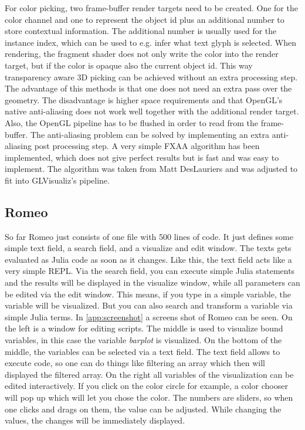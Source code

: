 For color picking, two frame-buffer render targets need to be created. 
One for the color channel and one to represent the object id plus an additional number to store contextual information. The additional number is usually used for the instance index, which can be used to e.g. infer what text glyph is selected.
When rendering, the fragment shader does not only write the color into the render target, but if the color is opaque also the current object id.
This way transparency aware 3D picking can be achieved without an extra processing step. 
The advantage of this methods is that one does not need an extra pass over the geometry. The disadvantage is higher space requirements and that OpenGL's native anti-aliasing does not work well together with the additional render target. Also, the OpenGL pipeline has to be flushed in order to read from the frame-buffer.
The anti-aliasing problem can be solved by implementing an extra anti-aliasing post processing step. A very simple FXAA algorithm has been implemented, which does not give perfect results but is fast and was easy to implement. The algorithm was taken from Matt DesLauriers\cite{FXAA} and was adjusted to fit into GLVisualiz's pipeline.


\subsection{Romeo}

So far Romeo just consists of one file with 500 lines of code. It just defines some simple text field, a search field, and a visualize and edit window.
The texts gets evaluated as Julia code as soon as it changes. Like this, the text field acts like a very simple \ac{REPL}.
Via the search field, you can execute simple Julia statements and the results will be displayed in the visualize window, while all parameters can be edited via the edit window.
This means, if you type in a simple variable, the variable will be visualized. But you can also search and transform a variable via simple Julia terms.
In \ref{app:screenshot} a screens shot of Romeo can be seen.
On the left is a window for editing scripts. The middle is used to visualize bound variables, in this case the variable \textit{barplot} is visualized.
On the bottom of the middle, the variables can be selected via a text field. The text field allows to execute code, so one can do things like filtering an array which then will displayed the filtered array.
On the right all variables of the visualization can be edited interactively.
If you click on the color circle for example, a color chooser will pop up which will let you chose the color.
The numbers are sliders, so when one clicks and drags on them, the value can be adjusted. 
While changing the values, the changes will be immediately displayed.

